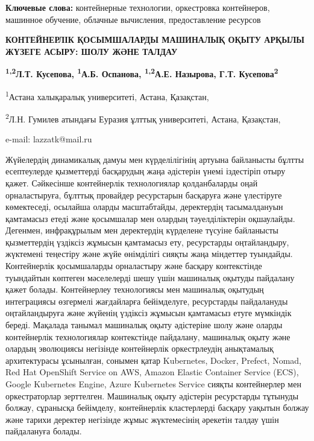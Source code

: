 {\bfseries Ключевые слова:} контейнерные технологии, оркестровка
контейнеров, машинное обучение, облачные вычисления, предоставление
ресурсов

\begin{center}
{\large\bfseries КОНТЕЙНЕРЛІК ҚОСЫМШАЛАРДЫ МАШИНАЛЫҚ ОҚЫТУ АРҚЫЛЫ ЖҮЗЕГЕ АСЫРУ:
ШОЛУ ЖӘНЕ ТАЛДАУ}

{\bfseries \textsuperscript{1,2}Л.Т. Кусепова\envelope, \textsuperscript{1}А.Б.
Оспанова, \textsuperscript{1,2}А.Е. Назырова, Г.Т.
Кусепова\textsuperscript{2}}

\textsuperscript{1}Астана халықаралық университеті, Астана, Қазақстан,

\textsuperscript{2}Л.Н. Гумилев атындағы Еуразия ұлттық университеті,
Астана, Қазақстан,

e-mail: lazzatk@mail.ru
\end{center}

Жүйелердің динамикалық дамуы мен күрделілігінің артуына байланысты
бұлтты есептеулерде қызметтерді басқарудың жаңа әдістерін үнемі
іздестіріп отыру қажет. Сәйкесінше контейнерлік технологиялар
қолданбаларды оңай орналастыруға, бұлттық провайдер ресурстарын
басқаруға және үлестіруге көмектеседі, осылайша оларды масштабтайды,
деректердің тасымалдануын қамтамасыз етеді және қосымшалар мен олардың
тәуелділіктерін оқшаулайды. Дегенмен, инфрақұрылым мен деректердің
күрделене түсуіне байланысты қызметтердің үздіксіз жұмысын қамтамасыз
ету, ресурстарды оңтайландыру, жүктемені теңестіру және жүйе өнімділігі
сияқты жаңа міндеттер туындайды. Контейнерлік қосымшаларды орналастыру
және басқару контекстінде туындайтын көптеген мәселелерді шешу үшін
машиналық оқытуды пайдалану қажет болады. Контейнерлеу технологиясы мен
машиналық оқытудың интеграциясы өзгермелі жағдайларға бейімделуге,
ресурстарды пайдалануды оңтайландыруға және жүйенің үздіксіз жұмысын
қамтамасыз етуге мүмкіндік береді. Мақалада танымал машиналық оқыту
әдістеріне шолу және оларды контейнерлік технологиялар контекстінде
пайдалану, машиналық оқыту және олардың эволюциясы негізінде
контейнерлік оркестрлеудің анықтамалық архитектурасы ұсынылған, сонымен
қатар Kubernetes, Docker, Prefect, Nomad, Red Hat OpenShift Service on
AWS, Amazon Elastic Container Service (ECS), Google Kubernetes Engine,
Azure Kubernetes Service сияқты контейнерлер мен оркестраторлар
зерттелген. Машиналық оқыту әдістерін ресурстарды тұтынуды болжау,
сұранысқа бейімделу, контейнерлік кластерлерді басқару уақытын болжау
және тарихи деректер негізінде жұмыс жүктемесінің әрекетін талдау үшін
пайдалануға болады.

